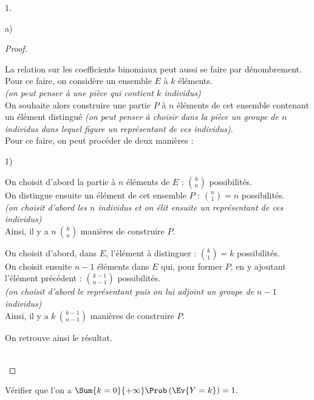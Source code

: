 \begin{noliste}{1.}
\begin{noliste}{a)}
\begin{proof}
      \newpage


      \begin{remark}
        La relation sur les coefficients binomiaux peut aussi se
        faire par dénombrement.\\
        Pour ce faire, on considère un ensemble $E$ à $k$ éléments.\\
        {\it (on peut penser à une pièce qui contient $k$
          individus)}\\
        On souhaite alors construire une partie $P$ à $n$ éléments de
        cet ensemble contenant un élément distingué {\it (on peut
          penser à choisir dans la pièce un groupe de $n$ individus
          dans lequel figure un représentant de ces individus)}.\\
        Pour ce faire, on peut procéder de deux manières :
        \begin{noliste}{1)}
        \item On choisit d'abord la partie à $n$ éléments de $E$ :
          $\binom{k}{n}$ possibilités.\\[.1cm]
          On distingue ensuite un élément de cet ensemble $P$ :
          $\binom{n}{1} = n$ possibilités.\\
          {\it (on choisit d'abord les $n$ individus et on élit
            ensuite un représentant de ces individus)}\\[.1cm]
          Ainsi, il y a $n \ \binom{k}{n}$ manières de construire $P$.
          
        \item On choisit d'abord, dans $E$, l'élément à distinguer :
          $\binom{k}{1} = k$ possibilités.\\[.1cm]
          On choisit ensuite $n-1$ éléments dans $E$ qui, pour former
          $P$, en y ajoutant l'élément précédent : $\binom{k-1}{n-1}$
          possibilités.\\
          {\it (on choisit d'abord le représentant puis on lui adjoint
            un groupe de $n-1$ individus)}\\[.1cm]
          Ainsi, il y a $k \ \binom{k-1}{n-1}$ manières de construire
          $P$.
        \end{noliste}
        On retrouve ainsi le résultat.
      \end{remark}~\\[-1.4cm]
    \end{proof}
    
  \item Vérifier que l'on a $\Sum{k = 0}{+ \infty}\Prob\left(\Ev{Y =
        k}\right) = 1.$


\end{noliste}
\end{noliste}
